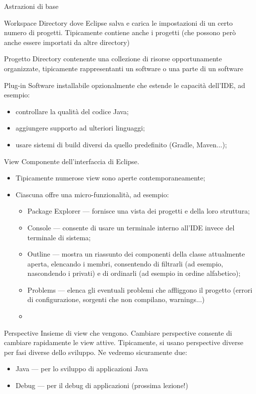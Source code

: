 \documentclass[presentation]{beamer}
\begin{document}
\begin{frame}[allowframebreaks]{Astrazioni di base}
	\begin{block}{Workspace}
		Directory dove Eclipse salva e carica le impostazioni di un certo numero di progetti. Tipicamente contiene anche i progetti (che possono però anche essere importati da altre directory)
	\end{block}
	\begin{block}{Progetto}
		Directory contenente una collezione di risorse opportunamente organizzate, tipicamente rappresentanti un software o una parte di un software
	\end{block}
	\begin{block}{Plug-in}
		Software installabile opzionalmente che estende le capacità dell'IDE, ad esempio:
		\begin{itemize}
			\item controllare la qualità del codice Java;
			\item aggiungere supporto ad ulteriori linguaggi;
			\item usare sistemi di build diversi da quello predefinito (Gradle, Maven...);
		\end{itemize}
	\end{block}
	\begin{block}{View}
		Componente dell'interfaccia di Eclipse.
		\begin{itemize}
			\item Tipicamente numerose view sono aperte contemporaneamente;
			\item Ciascuna offre una micro-funzionalità, ad esempio:
			\begin{itemize}
				\item Package Explorer --- fornisce una vista dei progetti e della loro struttura;
				\item Console --- consente di usare un terminale interno all'IDE invece del terminale di sistema;
				\item Outline --- mostra un riassunto dei componenti della classe attualmente aperta, elencando i membri, consentendo di filtrarli (ad esempio, nascondendo i privati) e di ordinarli (ad esempio in ordine alfabetico);
				\item Problems --- elenca gli eventuali problemi che affliggono il progetto (errori di configurazione, sorgenti che non compilano, warnings...)
				\item 
			\end{itemize}
		\end{itemize}
	\end{block}
	\begin{block}{Perspective}
		Insieme di view che vengono. Cambiare perspective consente di cambiare rapidamente le view attive. Tipicamente, si usano perspective diverse per fasi diverse dello sviluppo. Ne vedremo sicuramente due:
		\begin{itemize}
			\item Java --- per lo sviluppo di applicazioni Java
			\item Debug --- per il debug di applicazioni (prossima lezione!)
		\end{itemize}
	\end{block}
\end{frame}
\end{document}
